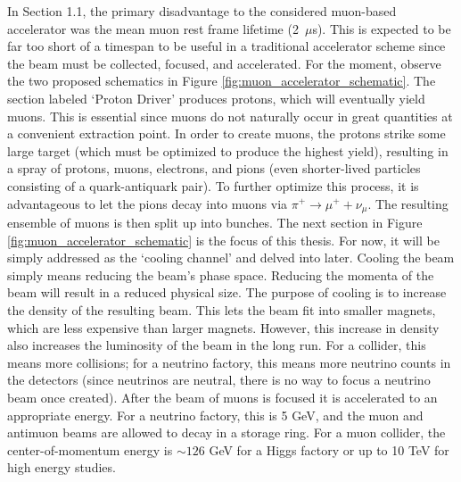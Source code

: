 In Section 1.1, the primary disadvantage to the considered muon-based accelerator was the mean muon rest frame lifetime (2~$\mu$s). This is expected to be far too short of a timespan to be useful in a traditional accelerator scheme since the beam must be collected, focused, and accelerated. For the moment, observe the two proposed schematics in Figure \ref{fig:muon_accelerator_schematic}\cite{map}. The section labeled `Proton Driver' produces protons, which will eventually yield muons. This is essential since muons do not naturally occur in great quantities at a convenient extraction point. In order to create muons, the protons strike some large target (which must be optimized to produce the highest yield), resulting in a spray of protons, muons, electrons, and pions (even shorter-lived particles consisting of a quark-antiquark pair). To further optimize this process, it is advantageous to let the pions decay into muons via $\pi^+ \rightarrow \mu^+ + \nu_\mu$. The resulting ensemble of muons is then split up into bunches. The next section in Figure \ref{fig:muon_accelerator_schematic} is the focus of this thesis. For now, it will be simply addressed as the `cooling channel' and delved into later. Cooling the beam simply means reducing the beam's phase space. Reducing the momenta of the beam will result in a reduced physical size. The purpose of cooling is to increase the density of the resulting beam. This lets the beam fit into smaller magnets, which are less expensive than larger magnets. However, this increase in density also increases the luminosity of the beam in the long run. For a collider, this means more collisions; for a neutrino factory, this means more neutrino counts in the detectors (since neutrinos are neutral, there is no way to focus a neutrino beam once created). After the beam of muons is focused it is accelerated to an appropriate energy. For a neutrino factory, this is 5 GeV, and the muon and antimuon beams are allowed to decay in a storage ring. For a muon collider, the center-of-momentum energy is $\sim 126$ GeV for a Higgs factory or up to 10 TeV for high energy studies.

